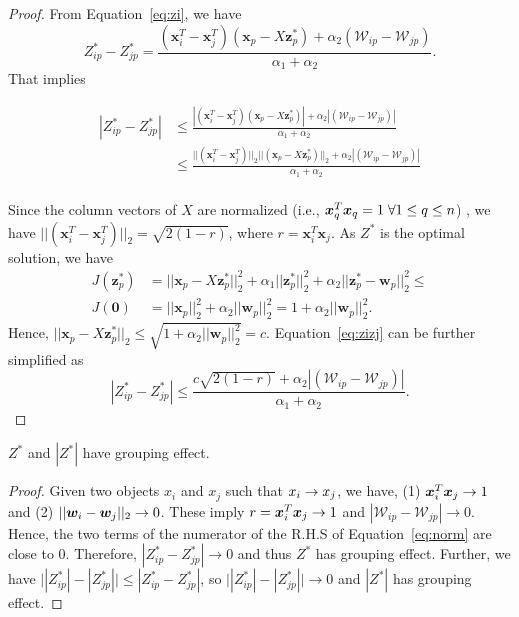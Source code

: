 \begin{proof}
From Equation~\ref{eq:zi}, we have 
\begin{equation}
\nonumber
Z_{ip}^*-Z_{jp}^* = \frac{(\bm{x}_i^T - \bm{x}_j^T)(\bm{x}_p-X\bm{z}_p^*) + \alpha_2 (\mathcal{W}_{ip}-\mathcal{W}_{jp})}{\alpha_1+\alpha_2}.
\end{equation}
That implies 
\begin{small}
\begin{equation}
\label{eq:zizj}
\begin{split}
|Z_{ip}^*-Z_{jp}^*| & \leq \frac{|(\bm{x}_i^T - \bm{x}_j^T)(\bm{x}_p-X\bm{z}_p^*)| + \alpha_2 |(\mathcal{W}_{ip}-\mathcal{W}_{jp})|}{\alpha_1+\alpha_2}\\
& \leq \frac{||(\bm{x}_i^T - \bm{x}_j^T)||_2||(\bm{x}_p-X\bm{z}_p^*)||_2 + \alpha_2 |(\mathcal{W}_{ip}-\mathcal{W}_{jp})|}{\alpha_1+\alpha_2}\\
\end{split}
\end{equation}
\end{small}

Since the column vectors of $X$ are normalized (i.e., $\bm{x}_q^T \bm{x}_q = 1 \; \forall 1 \leq q \leq n$) , we have
$||(\bm{x}_i^T - \bm{x}_j^T)||_2 = \sqrt{2(1-r)}$,
where $r = \bm{x}_i^T\bm{x}_j$.
As $Z^*$ is the optimal solution, we have
\begin{equation}
\begin{split}
J(\bm{z}_p^*) & = ||\bm{x}_p-X\bm{z}_p^*||_2^2 + \alpha_1 ||\bm{z}_p^*||_2^2 + \alpha_2 ||\bm{z}_p^*-\bm{w}_p||_2^2 \leq  \\
J(\bm{0}) & = ||\bm{x}_p||_2^2 + \alpha_2 ||\bm{w}_p||_2^2 = 1 + \alpha_2 ||\bm{w}_p||_2^2.
\end{split}
\end{equation}
Hence, $||\bm{x}_p-X\bm{z}_p^*||_2 \leq \sqrt{1 + \alpha_2 ||\bm{w}_p||_2^2} = c$.
Equation~\ref{eq:zizj} can be further simplified as
\begin{equation}
\nonumber
|Z_{ip}^*-Z_{jp}^*| \leq \frac{c\sqrt{2(1-r)}+ \alpha_2 |(\mathcal{W}_{ip}-\mathcal{W}_{jp})|}{\alpha_1+\alpha_2}.
\end{equation}
\end{proof}

\begin{lemma}
$Z^*$ and $|Z^*|$ have grouping effect.
\label{lemma:z-star}
\end{lemma}
\begin{proof}
Given two objects $x_i$ and $x_j$ such that $x_{i} \rightarrow x_{j}$,
we have,  %
(1) $\bm{x}_i^T \bm{x}_j \rightarrow 1$ and (2) $||{\bm w}_{i}-{\bm w}_{j}||_2 \rightarrow 0$.
These imply
$r = \bm{x}_i^T \bm{x}_j \rightarrow 1$ and  $|\mathcal{W}_{ip}-\mathcal{W}_{jp}| \rightarrow 0$.
Hence, the two terms of the numerator of the R.H.S of Equation~\ref{eq:norm} are close to 0. 
Therefore, $|Z_{ip}^*-Z_{jp}^*| \rightarrow 0$ and thus $Z^*$ has grouping effect.
Further,
we have 
$\bigl||Z_{ip}^*|-|Z_{jp}^*|\bigr| \leq |Z_{ip}^*-Z_{jp}^*|$,
so $\bigl||Z_{ip}^*|-|Z_{jp}^*|\bigr| \rightarrow 0$ and $|Z^*|$ has grouping effect.
\end{proof}

